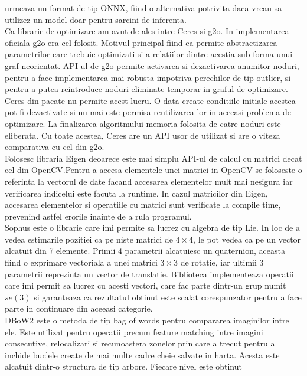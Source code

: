 \documentclass[12pt,a4paper]{report}
\begin{document}
urmeaza un format de tip ONNX, fiind o alternativa potrivita daca vreau sa utilizez un model doar 
pentru sarcini de inferenta.  \\
Ca librarie de optimizare am avut de ales intre Ceres si g2o. In implementarea oficiala 
g2o era cel folosit. Motivul principal fiind ca permite abstractizarea parametrilor care 
trebuie optimizati si a relatiilor dintre acestia sub forma unui graf neorientat. 
API-ul de g2o permite activarea si dezactivarea anumitor noduri, pentru a face implementarea 
mai robusta impotriva perechilor de tip outlier, si pentru a putea reintroduce noduri eliminate
temporar in graful de optimizare. Ceres din pacate nu permite acest lucru. O data create conditiile initiale acestea 
pot fi dezactivate si nu mai este permisa reutilizarea lor in aceeasi problema de optimizare. La
finalizarea algoritmului memoria folosita de catre noduri este eliberata. Cu toate acestea, Ceres
are un API usor de utilizat si are o viteza comparativa cu cel din g2o.\\
Folosesc libraria Eigen deoarece este mai simplu API-ul de calcul cu matrici decat 
cel din OpenCV.\@ Pentru a accesa elementele unei matrici in OpenCV se foloseste o referinta la 
vectorul de date facand accesarea elementelor mult mai nesigura iar verificarea indicelui este 
facuta la runtime. In cazul matricilor din Eigen, accesarea elementelor si operatiile
cu matrici sunt verificate la compile time, prevenind astfel erorile inainte de a rula programul. \\
Sophus este o librarie care imi permite sa lucrez cu algebra de tip Lie. In loc de a vedea
estimarile pozitiei ca pe niste matrici de $ 4 \times 4 $, le pot vedea ca pe un vector alcatuit din 7 
elemente. Primii 4 parametrii alcatuiesc un quaternion, aceasta fiind o exprimare vectoriala 
a unei matrici $ 3 \times 3 $ de rotatie, iar ultimii 3 parametrii reprezinta un vector de translatie.
Biblioteca implementeaza operatii care imi permit sa lucrez cu acesti vectori, care fac parte 
dintr-un grup numit \(se(3)\) si garanteaza ca rezultatul obtinut este scalat corespunzator 
pentru a face parte in continuare din aceeasi categorie. \\
DBoW2 este o metoda de tip bag of words pentru compararea imaginilor intre ele. Este utilizat
pentru operatii precum feature matching intre imagini consecutive, relocalizari si recunoastera
zonelor prin care a trecut pentru a inchide buclele create de mai multe cadre cheie salvate
in harta. Acesta este alcatuit dintr-o structura de tip arbore. Fiecare nivel este obtinut
\end{document}
